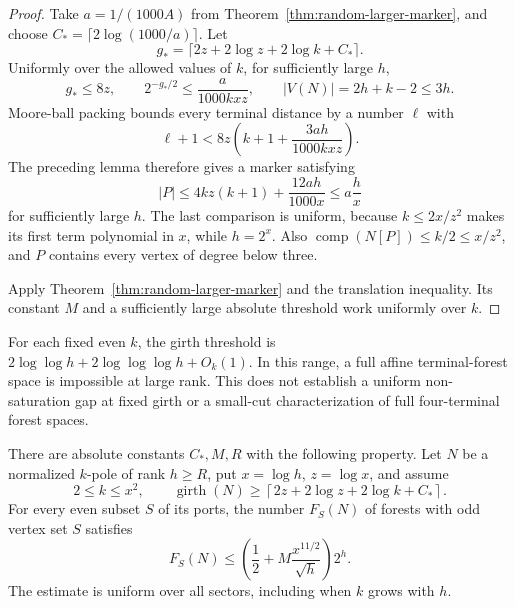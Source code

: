 \begin{proof}
Take $a=1/(1000A)$ from Theorem~\ref{thm:random-larger-marker}, and choose
$C_*=\lceil2\log(1000/a)\rceil$.
Let
\[
 g_*=\lceil2z+2\log z+2\log k+C_*\rceil.
\]
Uniformly over the allowed values of $k$, for sufficiently large $h$,
\[
 g_*\le8z,\qquad
 2^{-g_*/2}\le\frac{a}{1000kxz},\qquad
 |V(N)|=2h+k-2\le3h.
\]
Moore-ball packing bounds every terminal distance by a number $\ell$ with
\[
 \ell+1<8z\left(k+1+\frac{3ah}{1000kxz}\right).
\]
The preceding lemma therefore gives a marker satisfying
\[
 |P|\le4kz(k+1)+\frac{12ah}{1000x}
 \le a\frac h x
\]
for sufficiently large $h$.
The last comparison is uniform, because $k\le2x/z^2$ makes its first term polynomial in $x$, while $h=2^x$.
Also $\operatorname{comp}(N[P])\le k/2\le x/z^2$, and $P$ contains every vertex of degree below three.

Apply Theorem~\ref{thm:random-larger-marker} and the translation inequality.
Its constant $M$ and a sufficiently large absolute threshold work uniformly over $k$.
\end{proof}

For each fixed even $k$, the girth threshold is
$2\log\log h+2\log\log\log h+O_k(1)$.
In this range, a full affine terminal-forest space is impossible at large rank.
This does not establish a uniform non-saturation gap at fixed girth or a small-cut characterization of full four-terminal forest spaces.

\begin{theorem}
\label{thm:random-all-terminal-sectors-girth}
There are absolute constants $C_*,M,R$ with the following property.
Let $N$ be a normalized $k$-pole of rank $h\ge R$, put $x=\log h$, $z=\log x$, and assume
\[
 2\le k\le x^2,\qquad
 \operatorname{girth}(N)\ge
 \left\lceil2z+2\log z+2\log k+C_*\right\rceil.
\]
For every even subset $S$ of its ports, the number $F_S(N)$ of forests with odd vertex set $S$ satisfies
\[
 F_S(N)\le
 \left(\frac12+M\frac{x^{11/2}}{\sqrt h}\right)2^h.
\]
The estimate is uniform over all sectors, including when $k$ grows with $h$.
\end{theorem}

